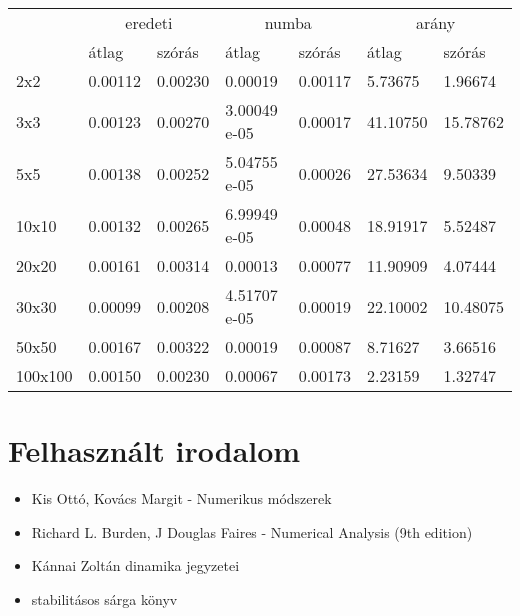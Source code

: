 \documentclass{article}
\theoremstyle{definition}
\theoremstyle{theorem}
\begin{document}
\begin{center}
\begin{tabular}{l|ll|ll|ll|}
\cline{2-7}
                              & \multicolumn{2}{c|}{eredeti}           & \multicolumn{2}{c|}{numba}             & \multicolumn{2}{c|}{arány}              \\ \cline{2-7}
                              & \multicolumn{1}{l|}{átlag}   & szórás  & \multicolumn{1}{l|}{átlag}   & szórás  & \multicolumn{1}{l|}{átlag}    & szórás  \\ \hline
\multicolumn{1}{|l|}{2x2}     & \multicolumn{1}{l|}{0.00112} & 0.00230 & \multicolumn{1}{l|}{0.00019} & 0.00117 & \multicolumn{1}{l|}{5.73675}  & 1.96674 \\ \hline
\multicolumn{1}{|l|}{3x3}   & \multicolumn{1}{l|}{0.00123} & 0.00270 & \multicolumn{1}{l|}{3.00049 e-05} & 0.00017 & \multicolumn{1}{l|}{41.10750} & 15.78762 \\ \hline
\multicolumn{1}{|l|}{5x5}   & \multicolumn{1}{l|}{0.00138} & 0.00252 & \multicolumn{1}{l|}{5.04755 e-05} & 0.00026 & \multicolumn{1}{l|}{27.53634} & 9.50339  \\ \hline
\multicolumn{1}{|l|}{10x10} & \multicolumn{1}{l|}{0.00132} & 0.00265 & \multicolumn{1}{l|}{6.99949 e-05} & 0.00048 & \multicolumn{1}{l|}{18.91917} & 5.52487  \\ \hline
\multicolumn{1}{|l|}{20x20}   & \multicolumn{1}{l|}{0.00161} & 0.00314 & \multicolumn{1}{l|}{0.00013} & 0.00077 & \multicolumn{1}{l|}{11.90909} & 4.07444 \\ \hline
\multicolumn{1}{|l|}{30x30} & \multicolumn{1}{l|}{0.00099} & 0.00208 & \multicolumn{1}{l|}{4.51707 e-05} & 0.00019 & \multicolumn{1}{l|}{22.10002} & 10.48075 \\ \hline
\multicolumn{1}{|l|}{50x50}   & \multicolumn{1}{l|}{0.00167} & 0.00322 & \multicolumn{1}{l|}{0.00019} & 0.00087 & \multicolumn{1}{l|}{8.71627}  & 3.66516 \\ \hline
\multicolumn{1}{|l|}{100x100} & \multicolumn{1}{l|}{0.00150} & 0.00230 & \multicolumn{1}{l|}{0.00067} & 0.00173 & \multicolumn{1}{l|}{2.23159}  & 1.32747 \\ \hline
\end{tabular}
\end{center}

\section{Felhasznált irodalom}
\begin{itemize}
    \item Kis Ottó, Kovács Margit - Numerikus módszerek
    \item Richard L. Burden, J Douglas Faires - Numerical Analysis (9th edition)
    \item Kánnai Zoltán dinamika jegyzetei
    \item stabilitásos sárga könyv
\end{itemize}
\end{document}
